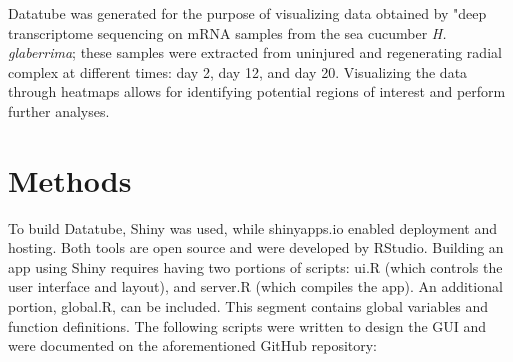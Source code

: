 \documentclass[12pt]{article}
\begin{document}
Datatube was generated for the purpose of visualizing data obtained by "deep transcriptome sequencing on mRNA samples from the sea cucumber \textit{H. glaberrima}; these samples were extracted from uninjured and regenerating radial complex at different times: day 2, day 12, and day 20. \cite{Mashanov12} Visualizing the data through heatmaps allows for identifying potential regions of interest and perform further analyses. 

\section{Methods}
To build Datatube, Shiny was used, while shinyapps.io enabled deployment and hosting. Both tools are open source and were developed by RStudio. \cite{shinyapps,shiny,R} Building an app using Shiny requires having two portions of scripts: ui.R (which controls the user interface and layout), and server.R (which compiles the app). An additional portion, global.R, can be included. This segment contains global variables and function definitions. The following scripts were written to design the GUI and were documented on the aforementioned GitHub repository:
\end{document}
